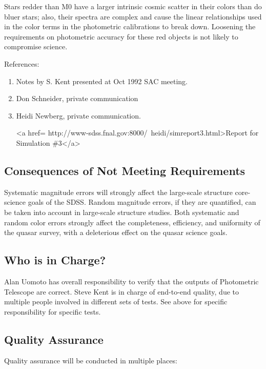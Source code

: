 \begin{enumerate}
\begin{enumerate}
Stars redder than M0 have a larger intrinsic cosmic scatter in their
colors than do bluer stars; also, their spectra are complex and cause
the linear relationships used in the color terms in the photometric calibrations 
to break down.  Loosening the requirements on photometric accuracy for
these red objects is
not likely to compromise science.

References:
\begin{enumerate}
\item	Notes by S. Kent presented at Oct 1992 SAC meeting.
\item	Don Schneider, private communication
\item	Heidi Newberg, private communication. 
\begin{rawhtml}
<a href= http://www-sdss.fnal.gov:8000/~heidi/simreport3.html>Report for Simulation
\#3</a>\end{rawhtml}
\end{enumerate}

\end{enumerate}

\end{enumerate}

\subsection{Consequences of Not Meeting Requirements}

Systematic magnitude errors will strongly affect the large-scale
structure core-science goals of the SDSS.  Random magnitude errors, if
they are quantified, can be taken into account in large-scale
structure studies.  Both
systematic and random color errors strongly affect the completeness,
efficiency, and uniformity of the quasar survey, with a deleterious
effect on the quasar science goals. 

\subsection{Who is in Charge?}
Alan Uomoto has overall responsibility to verify that the outputs of
Photometric Telescope are correct.
Steve Kent is in charge of end-to-end quality, due to multiple people involved
in different sets of tests.  See above for specific responsibility for
specific tests.

\subsection{Quality Assurance}
Quality assurance will be conducted in multiple places:

